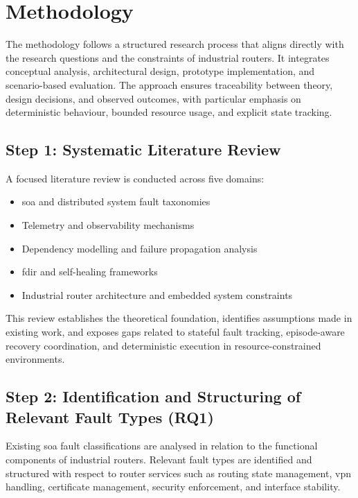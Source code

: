 \section{Methodology}\label{sec:methodology}

The methodology follows a structured research process that aligns directly with the research questions and the constraints of industrial routers. It integrates conceptual analysis, architectural design, prototype implementation, and scenario-based evaluation. The approach ensures traceability between theory, design decisions, and observed outcomes, with particular emphasis on deterministic behaviour, bounded resource usage, and explicit state tracking.

\subsection*{Step 1: Systematic Literature Review}

A focused literature review is conducted across five domains:
\begin{itemize}
\item \gls{soa} and distributed system fault taxonomies
\item Telemetry and observability mechanisms
\item Dependency modelling and failure propagation analysis
\item \gls{fdir} and self-healing frameworks
\item Industrial router architecture and embedded system constraints
\end{itemize}

This review establishes the theoretical foundation, identifies assumptions made in existing work, and exposes gaps related to stateful fault tracking, episode-aware recovery coordination, and deterministic execution in resource-constrained environments.

\subsection*{Step 2: Identification and Structuring of Relevant Fault Types (RQ1)}

Existing \gls{soa} fault classifications are analysed in relation to the functional components of industrial routers. Relevant fault types are identified and structured with respect to router services such as routing state management, \gls{vpn} handling, certificate management, security enforcement, and interface stability.

